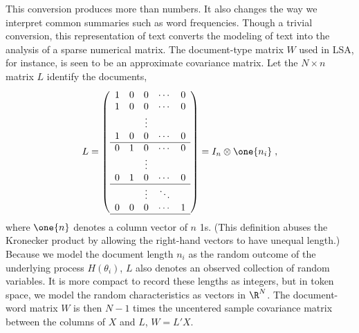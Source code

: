 \documentclass[12pt]{article}
\begin{document}
 This conversion produces more than numbers.  It also changes the way we
 interpret common summaries such as word frequencies. Though a trivial
 conversion, this representation of text converts the modeling of text into the analysis of
 a sparse numerical matrix.  The document-type
 matrix $W$ used in LSA, for instance, is seen to be an approximate covariance matrix.  Let
 the $N \times n$ matrix $L$ identify the documents,
\begin{equation}
  L =  \left(  
           \begin{array}{ccccc}
            1  & 0 & 0 & \cdots & 0 \cr
            1  & 0 & 0 & \cdots & 0 \cr
             &&  \vdots &&                       \cr
            1 & 0 &  0 & \cdots & 0 \cr \hline
            0 & 1 & 0  & \cdots & 0 \cr
              &&  \vdots &&                        \cr
            0 & 1& 0 & \cdots & 0 \cr \hline
              &&  \vdots  &\ddots&             \cr
            0 & 0& 0 & \cdots & 1 \cr \hline        
           \end{array}
         \right) = I_n \otimes \one{n_i}  \;,
\end{equation}
where $\one{n}$ denotes a column vector of $n$ 1s. (This definition abuses the Kronecker product by allowing the right-hand vectors to have unequal length.)  Because we model the document length $n_i$ as the random outcome of the underlying process $H(\theta_i)$, $L$ also denotes an observed collection of random variables.  It is more compact to record these lengths as integers, but in token space, we model the random characteristics as vectors in $\R^{N}$.  The document-word matrix $W$ is then $N-1$ times the uncentered sample covariance matrix between the columns of $X$ and $L$, $W =  L'X$.
\end{document}
